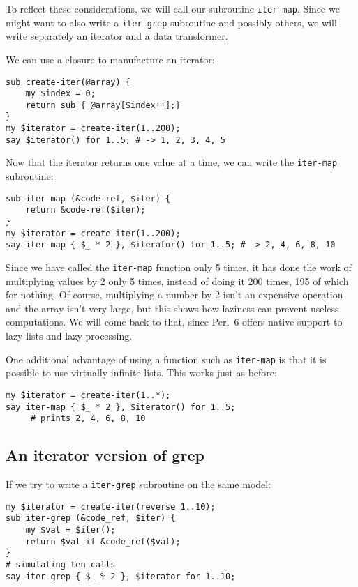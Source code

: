 To reflect these considerations, we will call our subroutine 
{\tt iter-map}. Since we might want to also write a 
{\tt iter-grep} subroutine and possibly others, we will 
write separately an iterator and a data transformer.

We can use a closure to manufacture an iterator:

\begin{verbatim}
sub create-iter(@array) {
    my $index = 0;
    return sub { @array[$index++];}
}
my $iterator = create-iter(1..200);
say $iterator() for 1..5; # -> 1, 2, 3, 4, 5
\end{verbatim} 

Now that the iterator returns one value at a time, we 
can write the {\tt iter-map} subroutine:

\begin{verbatim}
sub iter-map (&code-ref, $iter) {
    return &code-ref($iter);
}
my $iterator = create-iter(1..200);
say iter-map { $_ * 2 }, $iterator() for 1..5; # -> 2, 4, 6, 8, 10
\end{verbatim}

Since we have called the {\tt iter-map} function only 5 times, 
it has done the work of multiplying values by 2 only 5 times, 
instead of doing it 200 times, 195 of which for nothing. 
Of course, multiplying a number by 2 isn't an expensive 
operation and the array isn't very large, but this shows 
how laziness can prevent useless computations. We will come 
back to that, since Perl~6 offers native support to lazy 
lists and lazy processing.

One additional advantage of using a function such as 
{\tt iter-map} is that it is possible to use 
virtually infinite lists. This works just as before:

\begin{verbatim}
my $iterator = create-iter(1..*);
say iter-map { $_ * 2 }, $iterator() for 1..5;
     # prints 2, 4, 6, 8, 10
\end{verbatim}

\subsection{An iterator version of grep}

If we try to write a {\tt iter-grep} subroutine on the same 
model:

\begin{verbatim}
my $iterator = create-iter(reverse 1..10);
sub iter-grep (&code_ref, $iter) {
	my $val = $iter();
	return $val if &code_ref($val);
}
# simulating ten calls
say iter-grep { $_ % 2 }, $iterator for 1..10;
\end{verbatim}

